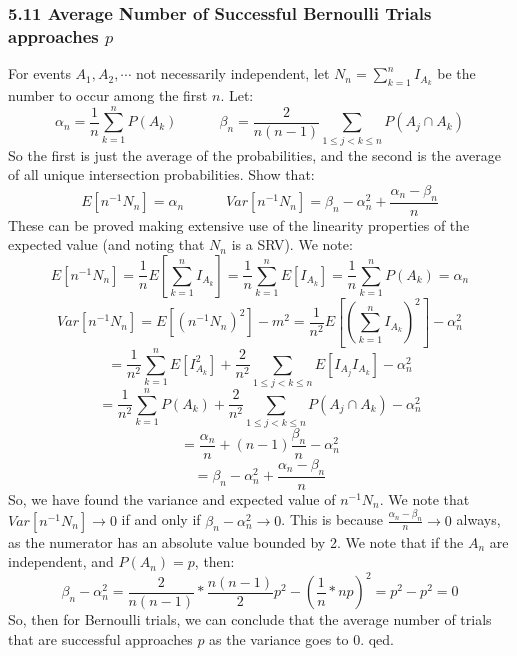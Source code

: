 \documentclass[12pt,a4paper]{article}
\newcommand{\1}[1]{\mathbbm{1}\left\{ #1 \right\}}
\begin{document}
\subsubsection{5.11 Average Number of Successful Bernoulli Trials approaches $p$} For events $A_1, A_2, \cdots$ not necessarily independent, let $N_n = \sum_{k=1}^n I_{A_k}$ be the number to occur among the first $n$. Let:
$$
	\alpha_n = \frac{1}{n} \sum_{k=1}^n P(A_k) \quad\quad\quad
	\beta_n = \frac{2}{n(n-1)} \sum_{1 \leq j < k \leq n} P(A_j \cap A_k)
$$
So the first is just the average of the probabilities, and the second is the average of all unique intersection probabilities. Show that:
$$
	E[n^{-1}N_n] = \alpha_n \quad\quad\quad
	Var[n^{-1}N_n] = \beta_n - \alpha_n^2 + \frac{\alpha_n - \beta_n}{n}
$$
These can be proved making extensive use of the linearity properties of the expected value (and noting that $N_n$ is a SRV). We note:
$$
	E[n^{-1}N_n] = \frac{1}{n}E\left[\sum_{k=1}^n I_{A_k}\right] = \frac{1}{n} \sum_{k=1}^n E[I_{A_k}] = \frac{1}{n} \sum_{k=1}^n P(A_k) = \alpha_n
$$
$$
	Var[n^{-1}N_n] = E[(n^{-1}N_n)^2] - m^2 =
	\frac{1}{n^2}E\left[\left(\sum_{k=1}^n I_{A_k}\right)^2\right] - \alpha_n^2
$$
$$
	= 
	\frac{1}{n^2}\sum_{k=1}^nE\left[I_{A_k}^2\right] + 
	\frac{2}{n^2} \sum_{1 \leq j < k \leq n} E\left[I_{A_j}I_{A_k}\right] - 
	\alpha_n^2
$$
$$
	=
	\frac{1}{n^2}\sum_{k=1}^n P(A_k) + 
	\frac{2}{n^2} \sum_{1 \leq j < k \leq n} P(A_j \cap A_k) - 
	\alpha_n^2
$$
$$
	= \frac{\alpha_n}{n} + (n-1)\frac{\beta_n}{n} - \alpha_n^2
$$
$$
	= \beta_n - \alpha_n^2 + \frac{\alpha_n - \beta_n}{n}
$$
So, we have found the variance and expected value of $n^{-1}N_n$. We note that $Var[n^{-1}N_n] \to 0$ if and only if $\beta_n - \alpha_n^2 \to 0$. This is because $\frac{\alpha_n - \beta_n}{n} \to 0$ always, as the numerator has an absolute value bounded by 2. We note that if the $A_n$ are independent, and $P(A_n) = p$, then:
$$
	\beta_n - \alpha_n^2 = \frac{2}{n(n-1)} * \frac{n(n-1)}{2} p^2 - \left(\frac{1}{n} * np\right)^2 = p^2 - p^2 = 0
$$
So, then for Bernoulli trials, we can conclude that the average number of trials that are successful approaches $p$ as the variance goes to $0$. qed.
\end{document}
